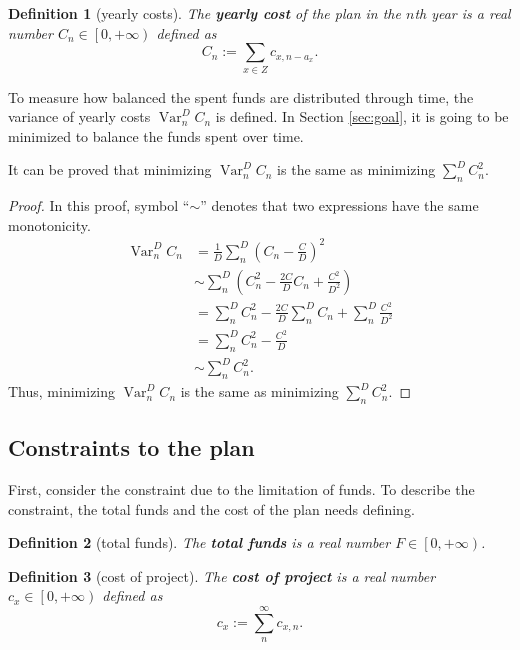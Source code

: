 \documentclass{article}
\DeclareMathOperator*{\var}{Var}
\newtheorem{definition}{Definition}
\begin{document}
\begin{definition}[yearly costs]
The \textbf{yearly cost} of the plan in the $n$th year is a real number $C_n\in\left[0,+\infty\right)$ defined as
\begin{equation}
C_n:=\sum_{x\in Z}c_{x,n-a_x}.
\end{equation}
\end{definition}

To measure how balanced the spent funds are distributed through time, the variance of yearly costs $\var_n^DC_n$ is defined.
In Section \ref{sec:goal}, it is going to be minimized to balance the funds spent over time.

It can be proved that minimizing $\var_n^DC_n$ is the same as minimizing $\sum_n^DC_n^2$.

\begin{proof}
In this proof, symbol ``$\sim$'' denotes that two expressions have the same monotonicity.
\begin{align*}
\var_n^DC_n&=\frac1D\sum_n^D\left(C_n-\frac CD\right)^2\\
&\sim\sum_n^D\left(C_n^2-\frac{2C}DC_n+\frac{C^2}{D^2}\right)\\
&=\sum_n^DC_n^2-\frac{2C}D\sum_n^DC_n+\sum_n^D\frac{C^2}{D^2}\\
&=\sum_n^DC_n^2-\frac{C^2}D\\
&\sim\sum_n^DC_n^2.
\end{align*}
Thus, minimizing $\var_n^DC_n$ is the same as minimizing $\sum_n^DC_n^2$.
\end{proof}

\subsection{Constraints to the plan}
\label{sec:constraints}

First, consider the constraint due to the limitation of funds.
To describe the constraint, the total funds and the cost of the plan needs defining.

\begin{definition}[total funds]
The \textbf{total funds} is a real number $F\in\left[0,+\infty\right)$.
\end{definition}

\begin{definition}[cost of project]
The \textbf{cost of project} is a real number $c_x\in\left[0,+\infty\right)$ defined as
\begin{equation}
c_x:=\sum_n^\infty c_{x,n}.
\end{equation}
\end{definition}
\end{document}
